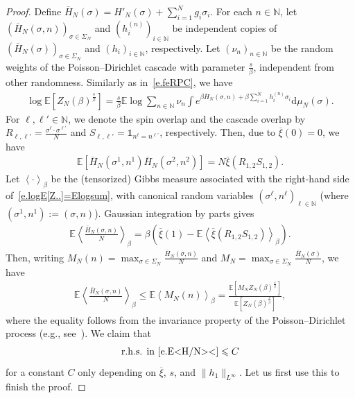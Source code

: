 \documentclass[11pt]{amsart}
\theoremstyle{remark}
\theoremstyle{definition}
\numberwithin{equation}{section}
\numberwithin{proposition}{section}
\numberwithin{figure}{section}
\numberwithin{table}{section}
\newcommand{\N}{\mathbb{N}}
\newcommand{\E}{\mathbb{E}}
\renewcommand{\leq}{\leqslant}
\renewcommand{\bar}{\overline}
\newcommand{\Ll}{\left}
\newcommand{\Rr}{\right}
\renewcommand{\d}{\mathrm{d}}
\newcommand{\1}{\mathbf{1}}
\newcommand{\la}{\left\langle}
\newcommand{\ra}{\right\rangle}
\newcommand{\pnp}{{(n)}}
\begin{document}
\begin{proof}
Define $\bar H_N(\sigma) = H'_N(\sigma) + \sum_{i=1}^Ng_i\sigma_i$.
For each $n\in\N$, let $(\bar H_N(\sigma,n))_{\sigma\in\Sigma_N}$ and $(h^\pnp_i)_{i\in\N}$ be independent copies of $(\bar H_N(\sigma))_{\sigma\in\Sigma_N}$ and $(h_i)_{i\in\N}$, respectively. 
Let $(\nu_n)_{n\in\N}$ be the random weights of the Poisson--Dirichlet cascade with parameter $\frac{s}{\beta}$, independent from other randomness.
Similarly as in~\eqref{e.feRPC}, we have
\begin{align}\label{e.logE[Z..]=Elogsum}
    \log \E \Ll[Z_N(\beta)^\frac{s}{\beta}\Rr] = \frac{s}{\beta}\E \log \sum_{n\in\N}\nu_n \int e^{\beta \bar H_N(\sigma,n)+\beta \sum_{i=1}^N h^\pnp_i\sigma_i}\d \mu_N(\sigma).
\end{align}
For $\ell,\ell'\in\N$, we denote the spin overlap and the cascade overlap by $R_{\ell,\ell'} = \frac{\sigma^\ell\cdot\sigma^{\ell'}}{N}$ and $S_{\ell,\ell'} = \mathds{1}_{n^\ell = n^{\ell'}}$, respectively. Then, due to $\bar\xi(0)=0$, we have 
\begin{align*}
    \E \Ll[\bar H_N(\sigma^1,n^1)\bar H_N(\sigma^2,n^2)\Rr] = N\bar\xi (R_{1,2}S_{1,2}).
\end{align*}
Let $\la\cdot\ra_\beta$ be the (tensorized) Gibbs measure associated with the right-hand side of~\eqref{e.logE[Z..]=Elogsum}, with canonical random variables $(\sigma^\ell,n^\ell)_{\ell\in\N}$ (where $(\sigma^1,n^1):=(\sigma,n)$). Gaussian integration by parts gives
\begin{align}\label{e.E<H/N>=()}
    \E \la \frac{\bar H_N(\sigma,n)}{N}\ra_\beta = \beta \Ll(\bar\xi(1) - \E \la \bar\xi(R_{1,2}S_{1,2})\ra_\beta\Rr).
\end{align}
Then, writing $M_N(n) = \max_{\sigma\in\Sigma_N}\frac{\bar H_N(\sigma,n)}{N}$ and $M_N = \max_{\sigma\in\Sigma_N}\frac{\bar H_N(\sigma)}{N}$, we have 
\begin{align}\label{e.E<H/N><}
    \E \la \frac{\bar H_N(\sigma,n)}{N}\ra_\beta \leq \E \la M_N(n)\ra_\beta = 
    \frac{\E\Ll[M_NZ_N(\beta)^\frac{s}{\beta}\Rr]}{\E\Ll[Z_N(\beta)^\frac{s}{\beta}\Rr]},
\end{align}
where the equality follows from the invariance property of the Poisson--Dirichlet process (e.g., see~\cite[Theorem~5.19]{dominguez2024book}).
We claim that 
\begin{align}\label{e.claim<C}
    \text{r.h.s. in~\eqref{e.E<H/N><}} \leq C
\end{align}
for a constant $C$ only depending on $\bar\xi$, $s$, and $\|h_1\|_{L^\infty}$. Let us first use this to finish the proof. 





\end{proof}
\end{document}
